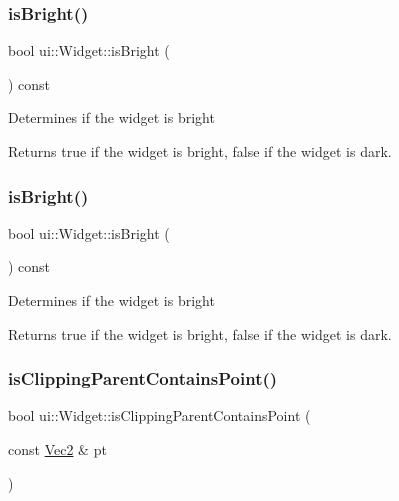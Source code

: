 \subsubsection{\texorpdfstring{is\+Bright()}{isBright()}\hspace{0.1cm}{\footnotesize\ttfamily [1/2]}}
{\footnotesize\ttfamily bool ui\+::\+Widget\+::is\+Bright (\begin{DoxyParamCaption}{ }\end{DoxyParamCaption}) const}

Determines if the widget is bright

\begin{DoxyReturn}{Returns}
true if the widget is bright, false if the widget is dark. 
\end{DoxyReturn}
\mbox{\label{classui_1_1Widget_a7c8b52f349c997848f23896acba7a44f}} 
\subsubsection{\texorpdfstring{is\+Bright()}{isBright()}\hspace{0.1cm}{\footnotesize\ttfamily [2/2]}}
{\footnotesize\ttfamily bool ui\+::\+Widget\+::is\+Bright (\begin{DoxyParamCaption}{ }\end{DoxyParamCaption}) const}

Determines if the widget is bright

\begin{DoxyReturn}{Returns}
true if the widget is bright, false if the widget is dark. 
\end{DoxyReturn}
\mbox{\label{classui_1_1Widget_a13fbdff1391a7936b8fd26d9257fc071}} 
\subsubsection{\texorpdfstring{is\+Clipping\+Parent\+Contains\+Point()}{isClippingParentContainsPoint()}\hspace{0.1cm}{\footnotesize\ttfamily [1/2]}}
{\footnotesize\ttfamily bool ui\+::\+Widget\+::is\+Clipping\+Parent\+Contains\+Point (\begin{DoxyParamCaption}\item[{const \hyperlink{classVec2}{Vec2} \&}]{pt }\end{DoxyParamCaption})}

